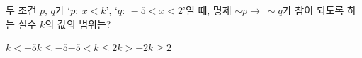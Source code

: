 두 조건 $p$, $q$가 `$p:\ x<k$', `$q:\ -5<x<2$'일 때, 명제 $\sim p\longrightarrow\ \sim q$가 참이 되도록 하는 실수 $k$의 값의 범위는?
\begin{choices32}{$k<-5$}{$k\le -5$}{$-5<k\le 2$}{$k>-2$}{$k\ge 2$}\end{choices32}

